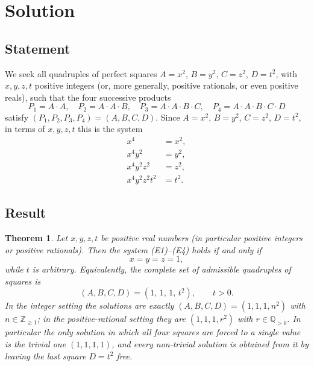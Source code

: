 \documentclass{amsart}
\newtheorem{theorem}{Theorem}
\begin{document}
\section*{Solution}

\subsection*{Statement}
We seek all quadruples of perfect squares $A=x^2$, $B=y^2$, $C=z^2$, $D=t^2$,
with $x,y,z,t$ positive integers (or, more generally, positive rationals, or even
positive reals), such that the four successive products
\[
P_1 = A\cdot A,\quad P_2 = A\cdot A\cdot B,\quad P_3 = A\cdot A\cdot B\cdot C,\quad
P_4 = A\cdot A\cdot B\cdot C\cdot D
\]
satisfy $(P_1,P_2,P_3,P_4)=(A,B,C,D)$. Since $A=x^2$, $B=y^2$, $C=z^2$, $D=t^2$,
in terms of $x,y,z,t$ this is the system
\begin{align}
x^4 &= x^2, \tag{E1}\\
x^4 y^2 &= y^2, \tag{E2}\\
x^4 y^2 z^2 &= z^2, \tag{E3}\\
x^4 y^2 z^2 t^2 &= t^2. \tag{E4}
\end{align}

\subsection*{Result}

\begin{theorem}
Let $x,y,z,t$ be positive real numbers (in particular positive integers or positive
rationals). Then the system \textup{(E1)--(E4)} holds if and only if
\[
x=y=z=1,
\]
while $t$ is \emph{arbitrary}. Equivalently, the complete set of admissible quadruples
of squares is
\[
(A,B,C,D)=(1,\,1,\,1,\,t^2),\qquad t>0 .
\]
In the integer setting the solutions are exactly $(A,B,C,D)=(1,1,1,n^2)$ with
$n\in\mathbb{Z}_{\ge 1}$; in the positive-rational setting they are
$(1,1,1,r^2)$ with $r\in\mathbb{Q}_{>0}$. In particular the only solution in which all
four squares are forced to a single value is the trivial one $(1,1,1,1)$, and every
non-trivial solution is obtained from it by leaving the last square $D=t^2$ free.
\end{theorem}
\end{document}
